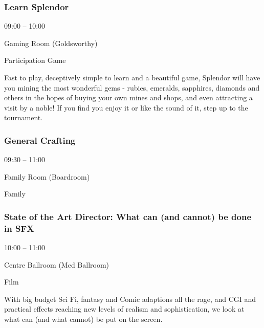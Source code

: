 \documentclass{scrreprt}
\begin{document}
\begin{multicols}{2}
\subsubsection*{Learn Splendor}\begin{description}
\setlength{\itemsep}{0pt}
\setlength{\parsep}{0pt}
\setlength{\parskip}{0pt}
\item[Time:]{09:00 -- 10:00}
\item[Venue:]{Gaming Room (Goldsworthy)}
\item[Tags:]{Participation Game}\end{description}
Fast to play, deceptively simple to learn and a beautiful game, Splendor will have you mining the most wonderful gems - rubies, emeralds, sapphires, diamonds and others in the hopes of buying your own mines and shops, and even attracting a visit by a noble! If you find you enjoy it or like the sound of it, step up to the tournament.
\subsubsection*{General Crafting}\begin{description}
\setlength{\itemsep}{0pt}
\setlength{\parsep}{0pt}
\setlength{\parskip}{0pt}
\item[Time:]{09:30 -- 11:00}
\item[Venue:]{Family Room (Boardroom)}
\item[Tags:]{Family}\end{description}

\subsubsection*{State of the Art Director: What can (and cannot) be done in SFX}\begin{description}
\setlength{\itemsep}{0pt}
\setlength{\parsep}{0pt}
\setlength{\parskip}{0pt}
\item[Time:]{10:00 -- 11:00}
\item[Venue:]{Centre Ballroom (Med Ballroom)}
\item[Tags:]{Film}\end{description}
With big budget Sci Fi, fantasy and Comic adaptions all the rage, and CGI and practical effects reaching new levels of realism and sophistication, we look at what can (and what cannot) be put on the screen.

\end{multicols}
\end{document}
